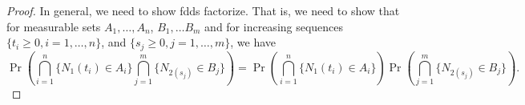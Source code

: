 \documentclass[a4paper,10pt]{article}
\theoremstyle{plain}
\theoremstyle{definition}
\begin{document}
\begin{proof}
In general, we need to show fdds factorize. That is, we need to show that for measurable sets $A_1, \hdots, A_n$, $B_1, \hdots B_m$ and for increasing sequences $\{t_i \geqslant 0, i = 1, \ldots, n\}$, and $\{s_j \geqslant 0, j = 1, \ldots, m\}$, we have \begin{equation*}
   \Pr\left(\bigcap_{i=1}^n\{N_{1}(t_{i})\in A_{i}\}\bigcap_{j=1}^m\{N_{2(s_{j})}\in B_{j}\}\right)
   =\Pr\left(\bigcap_{i=1}^n\{N_{1}(t_{i})\in A_{i}\}\right)\Pr\left(\bigcap_{j=1}^m\{N_{2(s_{j})}\in B_{j}\}\right).
\end{equation*}
\end{proof}
\end{document}
